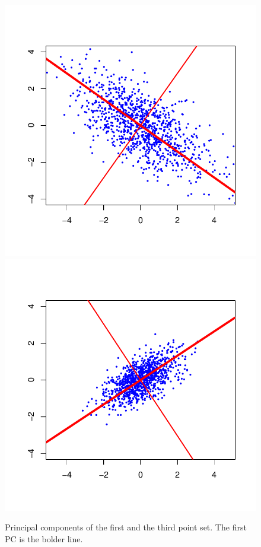 \documentclass{article}
\begin{document}
\begin{figure}
	\centering
	\includegraphics[scale=\sscale]{pcadir1}
	\includegraphics[scale=\sscale]{pcadir3}
	\caption{Principal components of the first and the third point set. The first PC is the bolder line.}
	\label{fig:pcadir}
\end{figure}
\end{document}
